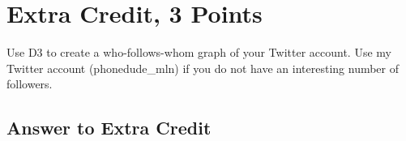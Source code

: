 \documentclass{article}
\begin{document}



\newpage

\section*{Extra Credit, 3 Points}

Use D3 to create a who-follows-whom graph of your Twitter account. Use my Twitter account (phonedude\_mln) if you do not have an interesting number of followers.


\subsection*{Answer to Extra Credit}
\end{document}
